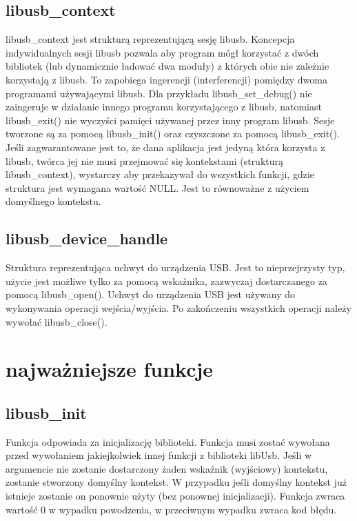 \documentclass{BscUS}
\begin{document}
\subsection{libusb\_context}
\noindent libusb\_context jest strukturą reprezentującą sesję libusb.
Koncepcja indywidualnych sesji libusb pozwala aby program mógł korzystać z dwóch bibliotek (lub dynamicznie ładować dwa moduły) z których obie nie zależnie korzystają z libusb. To zapobiega ingerencji (interferencji) pomiędzy dwoma programami używającymi libusb. Dla przykładu libusb\_set\_debug() nie zaingeruje w działanie innego programu korzystającego z libusb, natomiast libusb\_exit() nie wyczyści pamięci używanej przez inny program libusb.
Sesje tworzone są za pomocą libusb\_init() oraz czyszczone za pomocą libusb\_exit(). Jeśli zagwarantowane jest to, że dana aplikacja jest jedyną która korzysta z libusb, twórca jej nie musi przejmować się kontekstami (strukturą libusb\_context), wystarczy aby przekazywał do wszystkich funkcji, gdzie struktura jest wymagana wartość NULL. Jest to równoważne z użyciem domyślnego kontekstu.
\subsection{libusb\_device\_handle}
\noindent Struktura reprezentująca uchwyt do urządzenia USB.
Jest to nieprzejrzysty typ, użycie jest możliwe tylko za pomocą wskaźnika, zazwyczaj dostarczanego za pomocą libusb\_open().
Uchwyt do urządzenia USB jest używany do wykonywania operacji wejścia/wyjścia. Po zakończeniu wszystkich operacji należy wywołać libusb\_close().

\section{najważniejsze funkcje}
\subsection{libusb\_init}
\noindent Funkcja odpowiada za inicjalizację biblioteki.
Funkcja musi zostać wywołana przed wywołaniem jakiejkolwiek innej funkcji z biblioteki libUsb.
Jeśli w argumencie nie zostanie dostarczony żaden wskaźnik (wyjściowy) kontekstu, zostanie stworzony domyślny kontekst. W przypadku jeśli domyślny kontekst już istnieje zostanie on ponownie użyty (bez ponownej inicjalizacji).
Funkcja zwraca wartość 0 w wypadku powodzenia, w przeciwnym wypadku zwraca kod błędu.
\end{document}
